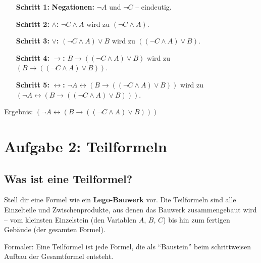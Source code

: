 \documentclass[a4paper,12pt]{article}
\begin{document}
\begin{enumerate}[leftmargin=2cm]
\item[\textbf{Schritt 1:}] \textbf{Negationen:} $\neg A$ und $\neg C$ -- eindeutig.

\item[\textbf{Schritt 2:}] \textbf{$\wedge$:}
$\neg C \wedge A$ wird zu $(\neg C \wedge A)$.

\item[\textbf{Schritt 3:}] \textbf{$\vee$:}
$(\neg C \wedge A) \vee B$ wird zu $((\neg C \wedge A) \vee B)$.

\item[\textbf{Schritt 4:}] \textbf{$\to$:}
$B \to ((\neg C \wedge A) \vee B)$ wird zu
$(B \to ((\neg C \wedge A) \vee B))$.

\item[\textbf{Schritt 5:}] \textbf{$\leftrightarrow$:}
$\neg A \leftrightarrow (B \to ((\neg C \wedge A) \vee B))$ wird zu
$(\neg A \leftrightarrow (B \to ((\neg C \wedge A) \vee B)))$.
\end{enumerate}

\begin{merkbox}
Ergebnis: $\boxed{(\neg A \leftrightarrow (B \to ((\neg C \wedge A) \vee B)))}$
\end{merkbox}

\newpage

\section{Aufgabe 2: Teilformeln}

\subsection{Was ist eine Teilformel?}

\begin{analogie}
Stell dir eine Formel wie ein \textbf{Lego-Bauwerk} vor. Die Teilformeln
sind alle Einzelteile und Zwischenprodukte, aus denen das Bauwerk
zusammengebaut wird -- vom kleinsten Einzelstein (den Variablen $A$, $B$, $C$)
bis hin zum fertigen Geb\"aude (der gesamten Formel).
\end{analogie}

Formaler: Eine Teilformel ist jede Formel, die als "`Baustein"' beim
schrittweisen Aufbau der Gesamtformel entsteht.
\end{document}
